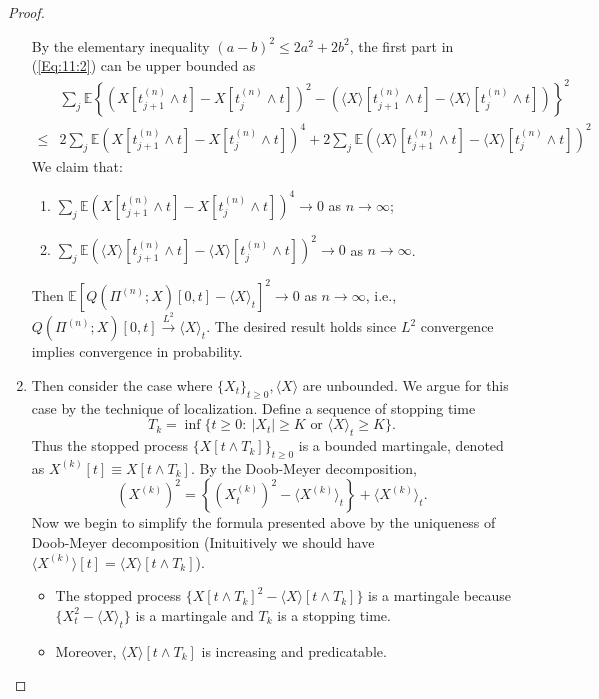 \begin{proof}
\begin{enumerate}
By the elementary inequality $(a-b)^2\le 2a^2+2b^2$, the first part in (\eqref{Eq:11:2}) can be upper bounded as
\begin{equation}
\begin{aligned}
&\sum_j\mathbb{E}
\left\{
\left(
X[t_{j+1}^{(n)}\land t] - X[t_{j}^{(n)}\land t]
\right)^2
- 
\left(
\langle X\rangle[t_{j+1}^{(n)}\land t] - \langle X\rangle[t_{j}^{(n)}\land t]
\right)
\right\}^2\\
\le&2\sum_j\mathbb{E}\left(
X[t_{j+1}^{(n)}\land t] - X[t_{j}^{(n)}\land t]
\right)^4 + 2\sum_j\mathbb{E}\left(
\langle X\rangle[t_{j+1}^{(n)}\land t] - \langle X\rangle[t_{j}^{(n)}\land t]
\right)^2
\end{aligned}
\end{equation}
We claim that:
\begin{enumerate}
\item
$\sum_j\mathbb{E}\left(
X[t_{j+1}^{(n)}\land t] - X[t_{j}^{(n)}\land t]
\right)^4\to 0$ as $n\to\infty$;
\item
$\sum_j\mathbb{E}\left(
\langle X\rangle[t_{j+1}^{(n)}\land t] - \langle X\rangle[t_{j}^{(n)}\land t]
\right)^2\to 0$ as $n\to\infty$.
\end{enumerate}
Then $\mathbb{E}\left[
Q(\Pi^{(n)};X)[0,t] - \langle X\rangle_t
\right]^2\to0$ as $n\to\infty$, i.e., $Q(\Pi^{(n)};X)[0,t]\xrightarrow{L^2}\langle X\rangle_t$. The desired result holds since $L^2$ convergence implies convergence in probability.
\item
Then consider the case where $\{X_t\}_{t\ge0},\langle X\rangle$ are unbounded.
We argue for this case by the technique of localization.
Define a sequence of stopping time
\[
T_k = \inf\{t\ge0:~|X_t|\ge K\text{ or }\langle X\rangle_t\ge K\}.
\]
Thus the stopped process $\{X[t\land T_k]\}_{t\ge0}$ is a bounded martingale, denoted as $X^{(k)}[t]\equiv X[t\land T_k]$.
By the Doob-Meyer decomposition,
\[
(X^{(k)})^2 = \left\{(X^{(k)}_t)^2-\langle X^{(k)}\rangle_t\right\} + \langle X^{(k)}\rangle_t.
\]
Now we begin to simplify the formula presented above by the uniqueness of Doob-Meyer decomposition (Inituitively we should have $\langle X^{(k)}\rangle[t]=\langle X\rangle[t\land T_k]$).
\begin{itemize}
\item
The stopped process $\{X[t\land T_k]^2-\langle X\rangle[t\land T_k]\}$ is a martingale because $\{X_t^2-\langle X\rangle_t\}$ is a martingale and $T_k$ is a stopping time.
\item
Moreover, $\langle X\rangle[t\land T_k]$ is increasing and predicatable.

\end{itemize}
\end{enumerate}
\end{proof}
